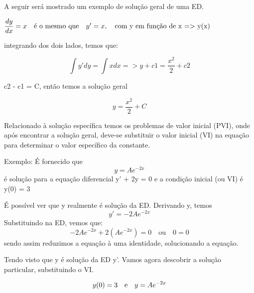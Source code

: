 A seguir será mostrado um exemplo de solução geral de uma ED.  \linebreak

			$ \dfrac{dy}{dx} = x \quad  \textrm{é o mesmo que} \quad y' = x, \quad \textrm{com y em função de x => y(x)} \\
			$
			

			integrando dos dois lados, temos que: \linebreak
			
			\begin{equation}
				\int y' dy = \int x dx => y + c1 = \dfrac{x^2}{2} + c2 
			\end{equation}
			
			\begin{center}
				c2 - c1 = C, então temos a solução geral  \\
			\end{center}
			
			\begin{equation}
				y = \frac{x^2}{2} + C
			\end{equation}
		
	
	

Relacionado à solução específica temos os problemas de valor inicial (PVI), onde após encontrar a solução geral, deve-se substituir o valor inicial (VI) na equação para determinar o valor específico da constante.

Exemplo: É fornecido que 
	\begin{equation}y = Ae^{-2x}
	\end{equation}
	é solução para a equação diferencial y' + 2y = 0 e a condição inicial (ou VI) é y(0) = 3 

É possível ver que y realmente é solução da ED.
		Derivando y, temos \begin{equation} y'= -2Ae^{-2x} \end{equation} Substituindo na ED, vemos que: 
		\begin{equation} -2Ae^{-2x} + 2(Ae^{-2x}) = 0  \quad \textrm{ou} \quad 0 = 0\end{equation} sendo assim reduzimos a equação à uma identidade, solucionando a equação.

		Tendo visto que y é solução da ED y'. Vamos agora descobrir a solução particular, substituindo o VI. 

		\begin{equation}
		y(0) = 3 \quad \textrm{e} \quad  y = Ae^{-2x} \newline 
		\end{equation}

